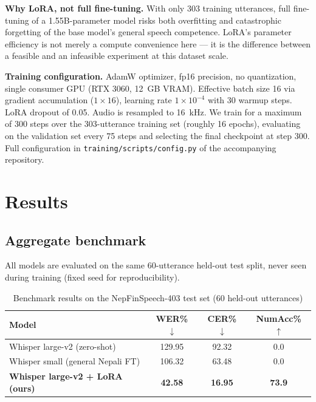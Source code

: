 \documentclass[11pt,a4paper]{article}
\begin{document}
\textbf{Why LoRA, not full fine-tuning.} With only 303 training utterances,
full fine-tuning of a 1.55B-parameter model risks both overfitting and
catastrophic forgetting of the base model's general speech competence.
LoRA's parameter efficiency is not merely a compute convenience here --- it
is the difference between a feasible and an infeasible experiment at this
dataset scale.

\textbf{Training configuration.} AdamW optimizer, fp16 precision, no
quantization, single consumer GPU (RTX 3060, 12~GB VRAM). Effective batch
size 16 via gradient accumulation ($1 \times 16$), learning rate
$1\times10^{-4}$ with 30 warmup steps. LoRA dropout of 0.05. Audio is
resampled to 16~kHz. We train for a maximum of 300 steps over the
303-utterance training set (roughly 16 epochs), evaluating on the
validation set every 75 steps and selecting the final checkpoint at step
300. Full configuration in \texttt{training/scripts/config.py} of the
accompanying repository.

\section{Results}
\label{sec:results}

\subsection{Aggregate benchmark}

All models are evaluated on the same 60-utterance held-out test split,
never seen during training (fixed seed for reproducibility).

\begin{table}[H]
\centering
\caption{Benchmark results on the NepFinSpeech-403 test set (60 held-out utterances)}
\label{tab:results}
\begin{tabular}{lccc}
\toprule
\textbf{Model} & \textbf{WER\% $\downarrow$} & \textbf{CER\% $\downarrow$} & \textbf{NumAcc\% $\uparrow$} \\
\midrule
Whisper large-v2 (zero-shot) & 129.95 & 92.32 & 0.0 \\
Whisper small (general Nepali FT) & 106.32 & 63.48 & 0.0 \\
\textbf{Whisper large-v2 + LoRA (ours)} & \textbf{42.58} & \textbf{16.95} & \textbf{73.9} \\
\bottomrule
\end{tabular}
\end{table}
\end{document}
